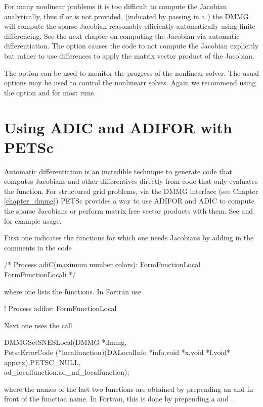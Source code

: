 For many nonlinear problems it is too difficult to compute the
Jacobian analytically, thus if  or  is not
provided, (indicated by passing in a ) the DMMG will compute the
sparse Jacobian reasonably efficiently automatically using finite
differencing. See the next chapter on computing the Jacobian via
automatic differentiation. The option 
causes the code to not compute the Jacobian explicitly but rather to
use differences to apply the matrix vector product of the Jacobian.

The option   can
be used to monitor the progress of the nonlinear solver. The usual  options
may be used to control the nonlinearr solves. Again we recommend using the 
option  and  for most runs.


\chapter{Using ADIC and ADIFOR with PETSc}

Automatic differentiation is an incredible technique to generate code
that computes Jacobians and other differentives directly from code
that only evaluates the function. For structured grid problems, via
the DMMG interface (see Chapter \ref{chapter_dmmg}) PETSc provides a way to use
ADIFOR and ADIC to compute the sparse Jacobians or perform matrix free
vector products with them. See
 and  for example
usage. 

First one indicates the functions for which one needs Jacobians by adding
in the comments in the code 
\begin{tabbing}
       /* Process adiC(maximum number colors): FormFunctionLocal FormFunctionLocali */
\end{tabbing}
where one lists the functions. In Fortran use
\begin{tabbing}
!     Process adifor: FormFunctionLocal
\end{tabbing}
Next one uses the call
\begin{tabbing}
  DMMGSetSNESLocal(DMMG *dmmg,\\
   PetscErrorCode (*localfunction)(DALocalInfo *info,void *x,void *f,void* appctx),PETSC\_NULL,\\
  ad\_localfunction,ad\_mf\_localfunction);
\end{tabbing}
where the names of the last two functions are obtained 
by prepending an  and  in front
of the function name. In Fortran, this is done by prepending a  and .

